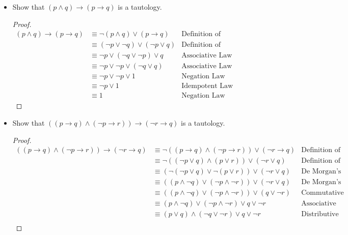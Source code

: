 \documentclass{article}
\begin{document}
\begin{itemize}
    \item[] Show that $(p \land q) \rightarrow (p \rightarrow q)$ is a tautology.
    \begin{proof}
        \begin{align*}
            (p \land q) \rightarrow (p \rightarrow q) &\equiv \neg(p \land q) \lor (p \rightarrow q) & \text{Definition of implication}\\
            &\equiv (\neg p \lor \neg q) \lor (\neg p \lor q) & \text{Definition of implication}\\
            &\equiv \neg p \lor (\neg q \lor \neg p) \lor q & \text{Associative Law}\\
            &\equiv \neg p \lor \neg p \lor (\neg q \lor q) & \text{Associative Law}\\
            &\equiv \neg p \lor \neg p \lor 1 & \text{Negation Law}\\
            &\equiv \neg p \lor 1 & \text{Idempotent Law}\\
            &\equiv 1 & \text{Negation Law}
        \end{align*}
    \end{proof}
    \item[] Show that $((p \rightarrow q) \land (\lnot p \rightarrow r)) \rightarrow (\lnot r \rightarrow q)$ is a tautology.
    \begin{proof}
        \begin{align*}
            ((p \rightarrow q) \land (\lnot p \rightarrow r)) \rightarrow (\lnot r \rightarrow q) &\equiv \neg((p \rightarrow q) \land (\lnot p \rightarrow r)) \lor (\lnot r \rightarrow q) & \text{Definition of implication}\\
            &\equiv \neg((\neg p \lor q) \land (p \lor r)) \lor (\neg r \lor q) & \text{Definition of implication}\\
            &\equiv (\neg(\neg p \lor q) \lor \neg(p \lor r)) \lor (\neg r \lor q) & \text{De Morgan's Law}\\
            &\equiv ((p \land \neg q) \lor (\neg p \land \neg r)) \lor (\neg r \lor q) & \text{De Morgan's Law}\\
            &\equiv ((p \land \neg q) \lor (\neg p \land \neg r)) \lor (q \lor \neg r) & \text{Commutative Law}\\
            &\equiv (p \land \neg q) \lor (\neg p \land \neg r) \lor q \lor \neg r & \text{Associative Law}\\
            &\equiv (p \lor q) \land (\neg q \lor \neg r) \lor q \lor \neg r & \text{Distributive Law}\\
            \end{align*}
        \end{proof}


\end{itemize}
\end{document}
